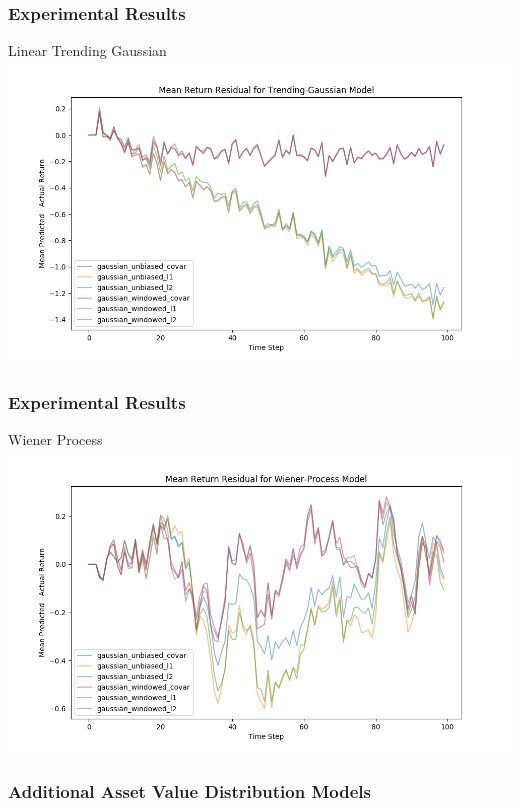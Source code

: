 \documentclass{beamer}
\begin{document}
\begin{frame}
    \frametitle{Experimental Results}

    \begin{block}{Linear Trending Gaussian}
        \includegraphics[width=\linewidth]{mean_return_residual-Trending-Gaussian_model.png}
    \end{block}

\end{frame}

\begin{frame}
    \frametitle{Experimental Results}

    \begin{block}{Wiener Process}
        \includegraphics[width=\linewidth]{mean_return_residual-Wiener-Process_model.png}
    \end{block}

\end{frame}

\begin{frame}
    \frametitle{Additional Asset Value Distribution Models}

\end{frame}
\end{document}
